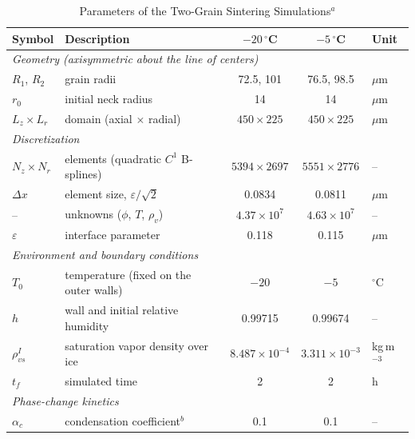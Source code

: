 \begin{table}
\caption{Parameters of the Two-Grain Sintering Simulations$^{a}$}
\centering
\begin{tabular}{l l c c l}
\hline
 Symbol & Description & $-20\,^\circ$C & $-5\,^\circ$C & Unit \\
\hline
 \multicolumn{5}{l}{\textit{Geometry (axisymmetric about the line of centers)}} \\
 $R_1$, $R_2$ & grain radii & 72.5, 101 & 76.5, 98.5 & $\mu$m \\
 $r_0$ & initial neck radius & 14 & 14 & $\mu$m \\
 $L_z \times L_r$ & domain (axial $\times$ radial) & $450 \times 225$ & $450 \times 225$ & $\mu$m \\
 \multicolumn{5}{l}{\textit{Discretization}} \\
 $N_z \times N_r$ & elements (quadratic $C^1$ B-splines) & $5394 \times 2697$ & $5551 \times 2776$ & -- \\
 $\Delta x$ & element size, $\varepsilon/\sqrt{2}$ & 0.0834 & 0.0811 & $\mu$m \\
 -- & unknowns ($\phi$, $T$, $\rho_v$) & $4.37 \times 10^{7}$ & $4.63 \times 10^{7}$ & -- \\
 $\varepsilon$ & interface parameter & 0.118 & 0.115 & $\mu$m \\
 \multicolumn{5}{l}{\textit{Environment and boundary conditions}} \\
 $T_0$ & temperature (fixed on the outer walls) & $-20$ & $-5$ & $^\circ$C \\
 $h$ & wall and initial relative humidity & 0.99715 & 0.99674 & -- \\
 $\rho_{vs}^{I}$ & saturation vapor density over ice & $8.487 \times 10^{-4}$ & $3.311 \times 10^{-3}$ & kg\,m$^{-3}$ \\
 $t_f$ & simulated time & 2 & 2 & h \\
 \multicolumn{5}{l}{\textit{Phase-change kinetics}} \\
 $\alpha_c$ & condensation coefficient$^{b}$ & 0.1 & 0.1 & -- \\

\end{tabular}
\end{table}
